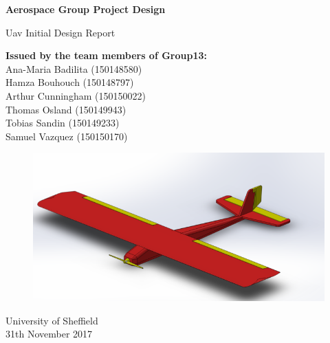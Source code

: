 \documentclass[12pt]{article}
\begin{document}
\setmainfont{Times New Roman}
\begin{titlepage}
    \begin{center}
        \vspace*{1cm}
        
        \textbf{\Huge{Aerospace Group Project Design}}
        
        \vspace{0.5cm}
        \LARGE{Uav Initial Design Report}
        
        \vspace{1.5cm}
        
        \normalsize{\textbf{Issued by the team members of Group13:}\\
        Ana-Maria Badilita (150148580)\\
        Hamza Bouhouch (150148797)\\
        Arthur Cunningham (150150022)\\
        Thomas Osland (150149943)\\
        Tobias Sandin (150149233)\\
        Samuel Vazquez (150150170)}

        \vfill

        \begin{figure}[h!]
            \includegraphics[width=15cm]{allplane.png}
        \end{figure}
        
        \vspace{0.8cm}
        
        University of Sheffield\\
        31th November 2017
        
    \end{center}
\end{titlepage}

\newpage
\end{document}
